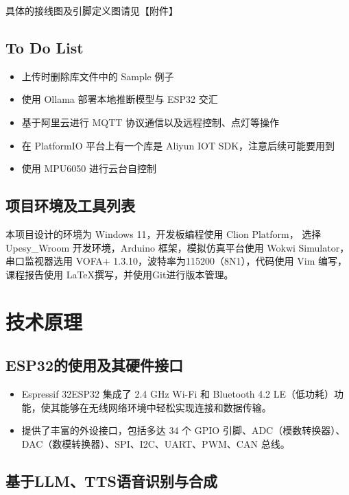     具体的接线图及引脚定义图请见【\textcolor{mygreen}{附件}】

\subsection{To Do List}

\begin{itemize}
    \item 上传时删除库文件中的 Sample 例子
    \item 使用 Ollama 部署本地推断模型与 ESP32 交汇
    \item 基于阿里云进行 MQTT 协议通信以及远程控制、点灯等操作
    \item 在 PlatformIO 平台上有一个库是 Aliyun IOT SDK，注意后续可能要用到
    \item 使用 MPU6050 进行云台自控制
\end{itemize}

\subsection{项目环境及工具列表}

本项目设计的环境为 Windows 11，开发板编程使用 Clion Platform，
选择 Upesy\_Wroom 开发环境，Arduino 框架，模拟仿真平台使用 Wokwi Simulator，
串口监视器选用 VOFA+ 1.3.10，波特率为115200（8N1），代码使用 Vim 编写，
课程报告使用 \LaTeX 撰写，并使用Git进行版本管理。


\section{技术原理}

\subsection{ESP32的使用及其硬件接口}

\begin{itemize}
    \item Espressif 32ESP32 集成了 2.4 GHz Wi-Fi 和 Bluetooth 4.2 LE（低功耗）功能，使其能够在无线网络环境中轻松实现连接和数据传输。
    \item 提供了丰富的外设接口，包括多达 34 个 GPIO 引脚、ADC（模数转换器）、DAC（数模转换器）、SPI、I2C、UART、PWM、CAN 总线。
\end{itemize}

\subsection{基于LLM、TTS语音识别与合成}

